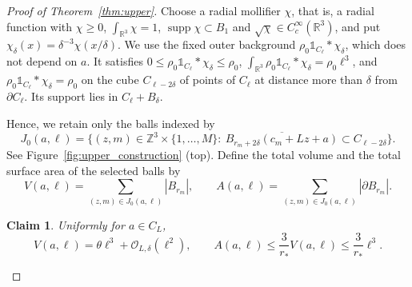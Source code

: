 \documentclass[final,reqno]{amsart}
\DeclareMathOperator{\supp}{supp}
\newtheorem*{claim}{Claim}
\theoremstyle{remark}
\theoremstyle{definition}
\renewcommand{\le}{\leqslant}
\renewcommand{\ge}{\geqslant}
\newcommand{\RR}{\mathbb{R}}
\newcommand{\ZZ}{\mathbb{Z}}
\newcommand{\iden}{\mathbb{1}}
\begin{document}
\begin{proof}[Proof of Theorem~\ref{thm:upper}]
Choose a radial mollifier $\chi$, that is, a radial function with $\chi\ge0$, $\int_{\RR^3}\chi=1$, $\supp\chi\subset B_1$ and $\sqrt\chi\in C_c^\infty(\RR^3)$, and put $\chi_\delta(x)=\delta^{-3}\chi(x/\delta)$. We use the fixed outer background $\rho_0\iden_{C_\ell}*\chi_\delta$, which does not depend on $a$. It satisfies $0\le\rho_0\iden_{C_\ell}*\chi_\delta\le\rho_0$, $\int_{\RR^3}\rho_0\iden_{C_\ell}*\chi_\delta=\rho_0\ell^3$, and $\rho_0\iden_{C_\ell}*\chi_\delta=\rho_0$ on the cube $C_{\ell-2\delta}$ of points of $C_\ell$ at distance more than $\delta$ from $\partial C_\ell$. Its support lies in $C_\ell+B_\delta$.

Hence, we retain only the balls indexed by
\begin{equation}\label{eq:upper_selected_indices}
J_0(a,\ell)=\big\{(z,m)\in\ZZ^3\times\{1,\dots,M\}:\ \overline{B_{r_m+2\delta}(c_m+Lz+a)}\subset C_{\ell-2\delta}\big\}.
\end{equation}
See Figure~\ref{fig:upper_construction} (top).
Define the total volume and the total surface area of the selected balls by
\[
V(a,\ell)=\sum_{(z,m)\in J_0(a,\ell)}|B_{r_m}|,
\qquad
A(a,\ell)=\sum_{(z,m)\in J_0(a,\ell)}|\partial B_{r_m}|.
\]
\begin{claim}
Uniformly for $a\in C_L$,
\begin{equation}\label{eq:upper_explicit_counting}
V(a,\ell)=\theta \ell^3+\mathcal O_{L,\delta}(\ell^2),
\qquad
A(a,\ell)\le\frac3{r_*}V(a,\ell)\le\frac3{r_*}\ell^3.
\end{equation}
\end{claim}


\end{proof}
\end{document}
